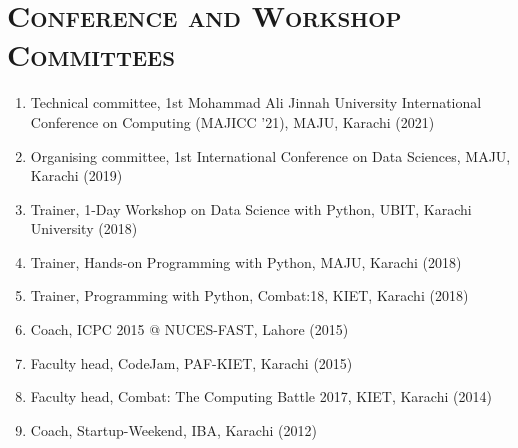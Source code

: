 \documentclass[a4paper, 10pt]{article}
\begin{document}
\section*{\normalfont\textsc{Conference and Workshop Committees}}
\begin{enumerate}
\itemsep-4pt
\item Technical committee, 1st Mohammad Ali Jinnah University International Conference on Computing (MAJICC '21), MAJU, Karachi (2021)
\item Organising committee, 1st International Conference on Data Sciences, MAJU, Karachi (2019)
\item Trainer, 1-Day Workshop on Data Science with Python, UBIT, Karachi University (2018)
\item  Trainer, Hands-on Programming with Python, MAJU, Karachi (2018)
\item  Trainer, Programming with Python, Combat:18, KIET, Karachi (2018)
\item  Coach, ICPC 2015 @ NUCES-FAST, Lahore (2015)
\item  Faculty head, CodeJam, PAF-KIET, Karachi (2015)
\item  Faculty head, Combat: The Computing Battle 2017, KIET, Karachi (2014)
\item  Coach, Startup-Weekend, IBA, Karachi (2012)
\end{enumerate}
\end{document}

